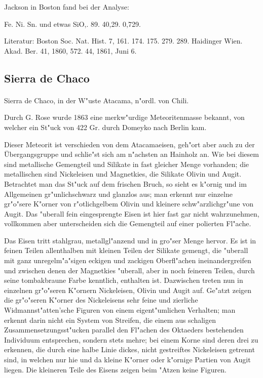 \documentclass[a4paper, 11pt, oneside]{article}
\begin{document}
Jackson in Boston fand bei der Analyse:

Fe. Ni. Sn. und etwas SiO,.
89. 40,29. 0,729.

\footnotesize
Literatur: Boston Soc. Nat. Hist. 7, 161. 174. 175. 279. 289. Haidinger Wien. Akad. Ber. 41, 1860, 572. 44, 1861, Juni 6.

\subsection{Sierra de Chaco}
\normalsize
\paragraph{}
Sierra de Chaco, in der W"uste Atacama, n"ordl. von Chili.

Durch G. Rose wurde 1863 eine merkw"urdige Meteoritenmasse bekannt, von welcher ein St"uck von 422 Gr. durch Domeyko nach Berlin kam.

Dieser Meteorit ist verschieden von dem Atacamaeisen, geh"ort aber auch zu der Übergangsgruppe und schlie"st sich am n"achsten an Hainholz an. Wie bei diesem sind metallische Gemengteil und Silikate in fast gleicher Menge vorhanden; die metallischen sind Nickeleisen und Magnetkies, die Silikate Olivin und Augit. Betrachtet man das St"uck auf dem frischen Bruch, so sieht es k"ornig und im Allgemeinen gr"unlichschwarz und glanzlos aus; man erkennt nur einzelne gr"o"sere K"orner von r"otlichgelbem Olivin und kleinere schw"arzlichgr"une von Augit. Das "uberall fein eingesprengte Eisen ist hier fast gar nicht wahrzunehmen, vollkommen aber unterscheiden sich die Gemengteil auf einer polierten Fl"ache.

Das Eisen tritt stahlgrau, metallgl"anzend und in gro"ser Menge hervor. Es ist in feinen Teilen allenthalben mit kleinen Teilen der Silikate gemengt, die "uberall mit ganz unregelm"a"sigen eckigen und zackigen Oberfl"achen ineinandergreifen und zwischen denen der Magnetkies "uberall, aber in noch feineren Teilen, durch seine tombakbraune Farbe kenntlich, enthalten ist. Dazwischen treten nun in einzelnen gr"o"seren K"ornern Nickeleisen, Olivin und Augit auf. Ge"atzt zeigen die gr"o"seren K"orner des Nickeleisens sehr feine und zierliche Widmannst"atten'sche Figuren von einem eigent"umlichen Verhalten; man erkennt darin nicht ein System von Streifen, die einem aus schaligen Zusammensetzungsst"ucken parallel den Fl"achen des Oktaeders bestehenden Individuum entsprechen, sondern stets mehre; bei einem Korne sind deren drei zu erkennen, die durch eine halbe Linie dickes, nicht gestreiftes Nickeleisen getrennt sind, in welchen nur hie und da kleine K"orner oder k"ornige Partien von Augit liegen. Die kleineren Teile des Eisens zeigen beim "Atzen keine Figuren.
\end{document}

